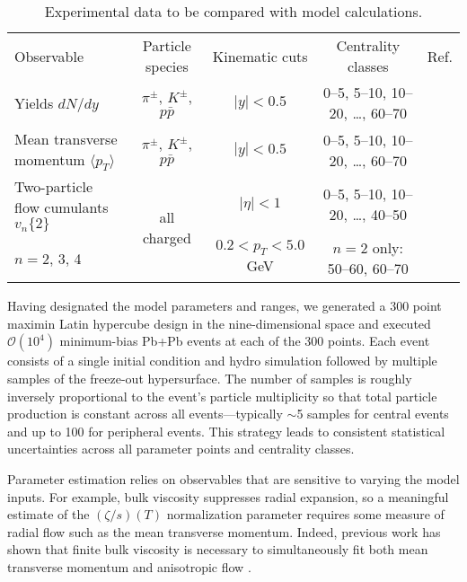 \documentclass[aps,prc,reprint,amsmath,nofootinbib,superscriptaddress]{revtex4-1}
\newcommand{\avg}[1]{\langle #1 \rangle}
\newcommand{\vnk}[2]{v_#1\{#2\}}
\newcommand{\paddedhline}{\noalign{\smallskip}\hline\noalign{\smallskip}}
\newcommand{\order}[1]{$\mathcal O(10^{#1})$}
\begin{document}
\begin{table*}
  \caption{
    \label{tab:observables}
    Experimental data to be compared with model calculations.
  }
  \begin{ruledtabular}
  \begin{tabular}{lcccc}
    Observable & Particle species & Kinematic cuts & Centrality classes & Ref. \\
    \paddedhline
    Yields $dN/dy$                       & $\pi^\pm$, $K^\pm$, $p\bar p$ &
    $|y| < 0.5$ & 0--5, 5--10, 10--20, \ldots, 60--70 & \cite{Abelev:2013vea} \\
    \noalign{\smallskip}
    Mean transverse momentum $\avg{p_T}$ & $\pi^\pm$, $K^\pm$, $p\bar p$ &
    $|y| < 0.5$ & 0--5, 5--10, 10--20, \ldots, 60--70 & \cite{Abelev:2013vea} \\
    \noalign{\smallskip}
    Two-particle flow cumulants $\vnk n 2$ & \multirow{2}{*}{all charged} &
    $|\eta| < 1$ & 0--5, 5--10, 10--20, \ldots, 40--50 &
    \multirow{2}{*}{\cite{ALICE:2011ab}} \\
    $n = 2$, 3, 4 & & $0.2 < p_T < 5.0$ GeV & $n = 2$ only: 50--60, 60--70 & \\
  \end{tabular}
  \end{ruledtabular}
\end{table*}

Having designated the model parameters and ranges, we generated a 300 point maximin Latin hypercube design \cite{Morris:1995lh} in the nine-dimensional space and executed \order 4 minimum-bias Pb+Pb events at each of the 300 points.
Each event consists of a single initial condition and hydro simulation followed by multiple samples of the freeze-out hypersurface.
The number of samples is roughly inversely proportional to the event's particle multiplicity so that total particle production is constant across all events---typically ${\sim}$5 samples for central events and up to 100 for peripheral events.
This strategy leads to consistent statistical uncertainties across all parameter points and centrality classes.

Parameter estimation relies on observables that are sensitive to varying the model inputs.
For example, bulk viscosity suppresses radial expansion, so a meaningful estimate of the $(\zeta/s)(T)$ normalization parameter requires some measure of radial flow such as the mean transverse momentum.
Indeed, previous work has shown that finite bulk viscosity is necessary to simultaneously fit both mean transverse momentum and anisotropic flow \cite{Ryu:2015vwa}.
\end{document}
